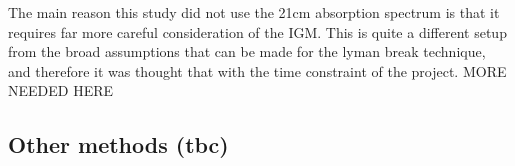             The main reason this study did not use the 21cm absorption spectrum is that it requires far more careful consideration of the IGM.  This is quite a different setup from the broad assumptions that can be made for the lyman break technique, and therefore it was thought that with the time constraint of the project. MORE NEEDED HERE

    
    \subsection{Other methods (tbc)} %
    \label{sub:Other_Methods_Reionization}


